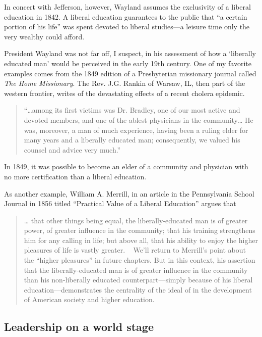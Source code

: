 In concert with Jefferson, however, Wayland assumes the exclusivity of a liberal education in 1842. A liberal education guarantees to the public that ``a certain portion of his life'' was spent devoted to liberal studies---a leisure time only the very wealthy could afford.

President Wayland was not far off, I suspect, in his assessment of how a `liberally educated man' would be perceived in the early 19th century. One of my favorite examples comes from the 1849 edition of a Presbyterian missionary journal called \emph{The Home Missionary}. The Rev. J.G. Rankin of Warsaw, IL, then part of the western frontier, writes of the devastating effects of a recent cholera epidemic. 

\begin{quote}

``{\ldots}among its first victims was Dr. Bradley, one of our most active and devoted members, and one of the ablest physicians in the community{\ldots} He was, moreover, a man of much experience, having been a ruling elder for many years and a liberally educated man; consequently, we valued his counsel and advice very much.'' ~\citep[p. 196]{Anonymous:1849ur}
\end{quote}

In 1849, it was possible to become an elder of a community and physician with no more certification than a liberal education. 

As another example, William A. Merrill, in an article in the Pennsylvania School Journal in 1856 titled ``Practical Value of a Liberal Education'' argues that 

\begin{quote}

{\ldots} that other things being equal, the liberally-educated man is of greater power, of greater influence in the community; that his training strengthens him for any calling in life; but above all, that his ability to enjoy the higher pleasures of life is vastly greater. ~\citep[p. 163]{Merril:1890ub}
We'll return to Merrill's point about the ``higher pleasures'' in future chapters. But in this context, his assertion that the liberally-educated man is of greater influence in the community than his non-liberally educated counterpart---simply because of his liberal education---demonstrates the centrality of the ideal of  in the development of American society and higher education.
\end{quote}

\subsection{Leadership on a world stage}
\label{leadershiponaworldstage}

